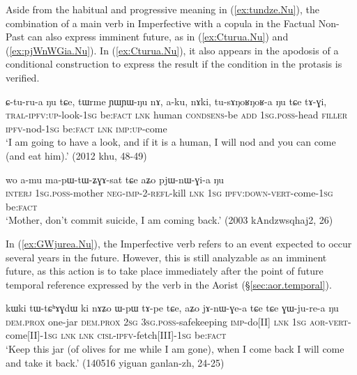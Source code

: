 Aside from the habitual and progressive meaning in (\ref{ex:tundze.Nu}), the  combination of a main verb in Imperfective with a copula in the Factual Non-Past can also express imminent future, as in (\ref{ex:Cturua.Nu}) and (\ref{ex:pjWnWGia.Nu}). In (\ref{ex:Cturua.Nu}), it also appears in the apodosis of a conditional construction to express the result if the condition in the protasis is verified.

\begin{exe}
\ex \label{ex:Cturua.Nu}
\gll  ɕ-tu-ru-a ŋu tɕe, tɯrme ɲɯ\redp{}ɲɯ-ŋu nɤ, a-ku, nɤki, tu-sɤŋoʁŋoʁ-a ŋu tɕe tɤ-ɣi, \\
\textsc{tral}-\textsc{ipfv}:\textsc{up}-look-\textsc{1sg} be:\textsc{fact} \textsc{lnk} human \textsc{cond}\redp{}\textsc{sens}-be \textsc{add} \textsc{1sg}.\textsc{poss}-head \textsc{filler} \textsc{ipfv}-nod-\textsc{1sg} be:\textsc{fact} \textsc{lnk} \textsc{imp}:\textsc{up}-come \\
\glt `I am going to have a look, and if it is a human, I will nod and you can come (and eat him).' (2012 khu, 48-49)
\end{exe}

\begin{exe}
\ex \label{ex:pjWnWGia.Nu}
\gll wo a-mu ma-pɯ-tɯ-ʑɣɤ-sat tɕe aʑo pjɯ-nɯ-ɣi-a ŋu \\
\textsc{interj} \textsc{1sg}.\textsc{poss}-mother \textsc{neg}-\textsc{imp}-2-\textsc{refl}-kill \textsc{lnk} \textsc{1sg} \textsc{ipfv}:\textsc{down}-\textsc{vert}-come-\textsc{1sg} be:\textsc{fact} \\
\glt `Mother, don't commit suicide, I am coming back.' (2003 kAndzwsqhaj2, 26)
\end{exe}

In (\ref{ex:GWjurea.Nu}), the Imperfective verb  refers to an event expected to occur several years in the future. However, this is still analyzable as an imminent future, as this action is to take place immediately after the point of future temporal reference expressed by the verb  in the Aorist (§\ref{sec:aor.temporal}).

\begin{exe}
\ex \label{ex:GWjurea.Nu}
\gll  kɯki tɯ-tɕʰɤɣdɯ ki nɤʑo ɯ-pɯ tɤ-pe tɕe,  aʑo jɤ-nɯ-ɣe-a tɕe tɕe ɣɯ-ju-re-a ŋu\\
\textsc{dem}.\textsc{prox} one-jar \textsc{dem}.\textsc{prox} \textsc{2sg} \textsc{3sg}.\textsc{poss}-safekeeping \textsc{imp}-do[II] \textsc{lnk} \textsc{1sg} \textsc{aor}-\textsc{vert}-come[II]-\textsc{1sg} \textsc{lnk} \textsc{lnk} \textsc{cisl}-\textsc{ipfv}-fetch[III]-\textsc{1sg} be:\textsc{fact}\\
\glt `Keep this jar (of olives for me while I am gone), when I come back I will come and take it back.' (140516 yiguan ganlan-zh, 24-25)
\end{exe}

